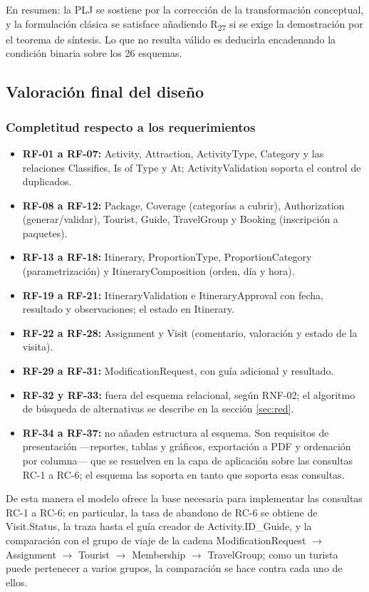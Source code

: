 \documentclass[11pt,a4paper]{article}
\begin{document}
En resumen: la PLJ se sostiene por la corrección de la transformación conceptual, y la formulación clásica se satisface añadiendo R\textsubscript{27} si se exige la demostración por el teorema de síntesis. Lo que no resulta válido es deducirla encadenando la condición binaria sobre los 26 esquemas.

\subsection{Valoración final del diseño}\label{sec:valoracion-final}
\subsubsection{Completitud respecto a los requerimientos}
\begin{itemize}[leftmargin=1.2em,itemsep=2pt,topsep=3pt]
\item \textbf{RF-01 a RF-07:} Activity, Attraction, ActivityType, Category y las relaciones Classifies, Is of Type y At; ActivityValidation soporta el control de duplicados.
\item \textbf{RF-08 a RF-12:} Package, Coverage (categorías a cubrir), Authorization (generar/validar), Tourist, Guide, TravelGroup y Booking (inscripción a paquetes).
\item \textbf{RF-13 a RF-18:} Itinerary, ProportionType, ProportionCategory (parametrización) y ItineraryComposition (orden, día y hora).
\item \textbf{RF-19 a RF-21:} ItineraryValidation e ItineraryApproval con fecha, resultado y observaciones; el estado en Itinerary.
\item \textbf{RF-22 a RF-28:} Assignment y Visit (comentario, valoración y estado de la visita).
\item \textbf{RF-29 a RF-31:} ModificationRequest, con guía adicional y resultado.
\item \textbf{RF-32 y RF-33:} fuera del esquema relacional, según RNF-02; el algoritmo de búsqueda de alternativas se describe en la sección \ref{sec:red}.
\item \textbf{RF-34 a RF-37:} no añaden estructura al esquema. Son requisitos de presentación —reportes, tablas y gráficos, exportación a PDF y ordenación por columna— que se resuelven en la capa de aplicación sobre las consultas RC-1 a RC-6; el esquema las soporta en tanto que soporta esas consultas.
\end{itemize}
De esta manera el modelo ofrece la base necesaria para implementar las consultas RC-1 a RC-6; en particular, la tasa de abandono de RC-6 se obtiene de Visit.Status, la traza hasta el guía creador de Activity.ID\_Guide, y la comparación con el grupo de viaje de la cadena ModificationRequest \ensuremath{\rightarrow} Assignment \ensuremath{\rightarrow} Tourist \ensuremath{\rightarrow} Membership \ensuremath{\rightarrow} TravelGroup; como un turista puede pertenecer a varios grupos, la comparación se hace contra cada uno de ellos.
\end{document}
